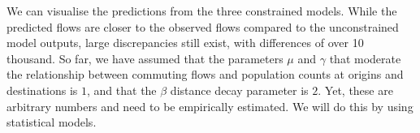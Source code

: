 \documentclass[
  a4paper, 
  twoside,
  final
]{article}
\newenvironment{Shaded}{\begin{snugshade}}{\end{snugshade}}
\newcommand{\AttributeTok}[1]{\textcolor[rgb]{0.40,0.45,0.13}{#1}}
\newcommand{\CommentTok}[1]{\textcolor[rgb]{0.37,0.37,0.37}{#1}}
\newcommand{\ConstantTok}[1]{\textcolor[rgb]{0.56,0.35,0.01}{#1}}
\newcommand{\ControlFlowTok}[1]{\textcolor[rgb]{0.00,0.23,0.31}{#1}}
\newcommand{\DecValTok}[1]{\textcolor[rgb]{0.68,0.00,0.00}{#1}}
\newcommand{\FunctionTok}[1]{\textcolor[rgb]{0.28,0.35,0.67}{#1}}
\newcommand{\NormalTok}[1]{\textcolor[rgb]{0.00,0.23,0.31}{#1}}
\newcommand{\OtherTok}[1]{\textcolor[rgb]{0.00,0.23,0.31}{#1}}
\newcommand{\SpecialCharTok}[1]{\textcolor[rgb]{0.37,0.37,0.37}{#1}}
\newcounter{code}
\begin{document}
\begin{Shaded}
\end{Shaded}

We can visualise the predictions from the three constrained models.
While the predicted flows are closer to the observed flows compared to
the unconstrained model outputs, large discrepancies still exist, with
differences of over 10 thousand. So far, we have assumed that the
parameters \(\mu\) and \(\gamma\) that moderate the relationship between
commuting flows and population counts at origins and destinations is
\(1\), and that the \(\beta\) distance decay parameter is \(2\). Yet,
these are arbitrary numbers and need to be empirically estimated. We
will do this by using statistical models.
\end{document}
